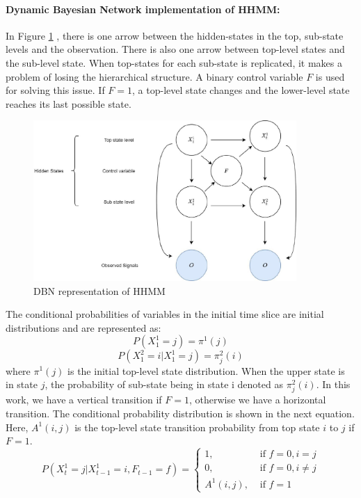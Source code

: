 \paragraph{Dynamic Bayesian Network implementation of HHMM:}
In Figure \ref{fig:DBN representation of HHMM} , there is one arrow between the hidden-states in the top,  sub-state levels and the observation. There is also one arrow between top-level states and the sub-level state. When top-states for each sub-state is replicated, it makes a problem of losing the hierarchical structure. A binary control variable $F$ is used for solving this issue. If $F=1$, a top-level state changes and the lower-level state reaches its last possible state.
\begin{figure}[ht]
	\centering
	\includegraphics[width=10cm]{gfx/DBN_representation_of_HHMM.png}
    \captionsetup{justification=centering}
	\caption{DBN representation of HHMM}
	\label{fig:DBN representation of HHMM}
\end{figure}
The conditional probabilities of variables in the initial
time slice are initial distributions and are represented as:
\begin{equation}
    P(X_{1}^{1}=j)=\pi ^{1}(j)
\end{equation}
\begin{equation}
    P(X_{1}^{2}=i|X_{1}^{1}=j)=\pi_{j}^{2}(i)
\end{equation}
where $\pi ^{1}(j)$ is the initial top-level state distribution. When the upper state is in state $j$, the probability of sub-state being in state i denoted as $\pi_{j}^{2}(i)$. In this work, we have a vertical transition if $F=1$, otherwise we have a horizontal transition.
 The conditional probability distribution is shown in the next equation. Here, $A^{1}(i,j)$ is the top-level state transition probability from top state $i$ to $j$ if $F=1$.
\begin{equation}
P(X_{t}^{1}=j|X_{t-1}^{1}=i,F_{t-1}=f)=\begin{cases}
1 ,& \text{ if } f=0 , i=j \\ 
0, & \text{ if } f=0 , i\neq j \\ 
A^{1}(i,j),& \text{ if } f= 1
\end{cases}
\end{equation}
